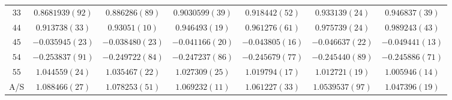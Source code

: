 \begin{table}
\begin{center}
\begin{tabular}{c|c c c c c c}
$33$ & $0.8681939(92)$ & $0.886286(89)$ & $0.9030599(39)$ & $0.918442(52)$ & $0.933139(24)$ & $0.946837(39)$ \\
$44$ & $0.913738(33)$ & $0.93051(10)$ & $0.946493(19)$ & $0.961276(61)$ & $0.975739(24)$ & $0.989243(43)$ \\
$45$ & $-0.035945(23)$ & $-0.038480(23)$ & $-0.041166(20)$ & $-0.043805(16)$ & $-0.046637(22)$ & $-0.049441(13)$ \\
$54$ & $-0.253837(91)$ & $-0.249722(84)$ & $-0.247237(86)$ & $-0.245679(77)$ & $-0.245440(89)$ & $-0.245886(71)$ \\
$55$ & $1.044559(24)$ & $1.035467(22)$ & $1.027309(25)$ & $1.019794(17)$ & $1.012721(19)$ & $1.005946(14)$ \\
\hline
A/S & $1.088466(27)$ & $1.078253(51)$ & $1.069232(11)$ & $1.061227(33)$ & $1.0539537(97)$ & $1.047396(19)$ \\
\hline
\hline
\end{tabular}
\end{center}
\end{table}